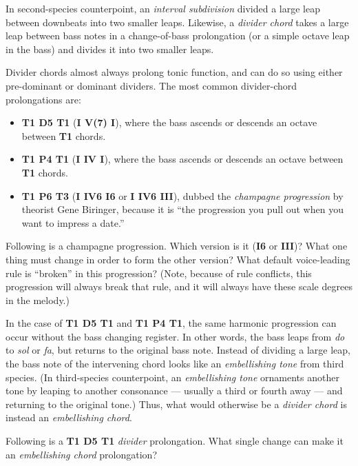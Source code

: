 \documentclass{book}
\providecommand{\tightlist}{%
  \setlength{\itemsep}{0pt}\setlength{\parskip}{0pt}}
\begin{document}
In second-species counterpoint, an \emph{interval subdivision} divided a large
leap between downbeats into two smaller leaps. Likewise, a \emph{divider
chord} takes a large leap between bass notes in a change-of-bass prolongation
(or a simple octave leap in the bass) and divides it into two smaller leaps.

Divider chords almost always prolong tonic function, and can do so using
either pre-dominant or dominant dividers. The most common divider-chord
prolongations are:

\begin{itemize}
\tightlist
\item
  \textbf{T1 D5 T1} (\textbf{I V(7) I}), where the bass ascends or descends an
  octave between \textbf{T1} chords.\\
\item
  \textbf{T1 P4 T1} (\textbf{I IV I}), where the bass ascends or descends an
  octave between \textbf{T1} chords.\\
\item
  \textbf{T1 P6 T3} (\textbf{I IV6 I6} or \textbf{I IV6 III}), dubbed the
  \emph{champagne progression} by theorist Gene Biringer, because it is ``the
  progression you pull out when you want to impress a date.''
\end{itemize}

Following is a champagne progression. Which version is it (\textbf{I6} or
\textbf{III})? What one thing must change in order to form the other version?
What default voice-leading rule is ``broken'' in this progression? (Note,
because of rule conflicts, this progression will always break that rule, and
it will always have these scale degrees in the melody.)

In the case of \textbf{T1 D5 T1} and \textbf{T1 P4 T1}, the same harmonic
progression can occur without the bass changing register. In other words, the
bass leaps from \emph{do} to \emph{sol} or \emph{fa}, but returns to the
original bass note. Instead of dividing a large leap, the bass note of the
intervening chord looks like an \emph{embellishing tone} from third species.
(In third-species counterpoint, an \emph{embellishing tone} ornaments another
tone by leaping to another consonance --- usually a third or fourth away ---
and returning to the original tone.) Thus, what would otherwise be a
\emph{divider chord} is instead an \emph{embellishing chord}.

Following is a \textbf{T1 D5 T1} \emph{divider} prolongation. What single
change can make it an \emph{embellishing chord} prolongation?
\end{document}

